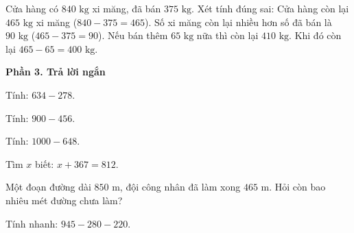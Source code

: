 \begin{ex} %
Cửa hàng có $840\text{ kg}$ xi măng, đã bán $375\text{ kg}$. Xét tính đúng sai:
\choiceTF
{\True Cửa hàng còn lại $465\text{ kg}$ xi măng ($840 - 375 = 465$).}
{\True Số xi măng còn lại nhiều hơn số đã bán là $90\text{ kg}$ ($465 - 375 = 90$).}
{Nếu bán thêm $65\text{ kg}$ nữa thì còn lại $410\text{ kg}$.}
{\True Khi đó còn lại $465 - 65 = 400\text{ kg}$.}
\end{ex}

\textbf{Phần 3. Trả lời ngắn}

\begin{ex} %
Tính: $634 - 278$.
\end{ex}

\begin{ex} %
Tính: $900 - 456$.
\end{ex}

\begin{ex} %
Tính: $1000 - 648$.
\end{ex}

\begin{ex} %
Tìm $x$ biết: $x + 367 = 812$.
\end{ex}

\begin{ex} %
Một đoạn đường dài $850\text{ m}$, đội công nhân đã làm xong $465\text{ m}$. Hỏi còn bao nhiêu mét đường chưa làm?
\end{ex}

\begin{ex} %
Tính nhanh: $945 - 280 - 220$.
\end{ex}
